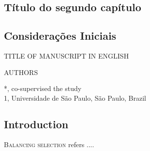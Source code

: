 \begin{refsection}
\chapter{Título do segundo capítulo}
\pagestyle{fancy}
\fancyhf{}
\fancyfoot[C]{\thepage}
\section{Considerações Iniciais}%
\newpage

\begin{otherlanguage}{english}
\begin{center}
\LARGE{TITLE OF MANUSCRIPT IN ENGLISH}
\end{center}

\begin{center}
AUTHORS
\end{center}

\small{*, co-supervised the study}
\\
\small{1, Universidade de São Paulo, São Paulo, Brazil}

\section{Introduction}

\lettrine[lines=3]{\color{airforceblue}B}{alancing selection} refers ....



\end{otherlanguage}
\end{refsection}
